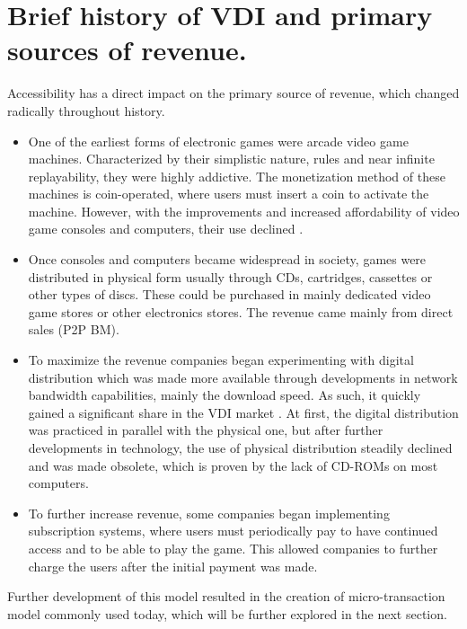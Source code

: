 \documentclass[10pt,british,a4paper,titlepage]{article}
\begin{document}
\section{Brief history of VDI and primary sources of revenue.}

Accessibility has a direct impact on the primary source of revenue, which changed radically throughout history.
 
\begin{itemize}

\item One of the earliest forms of electronic games were arcade video game machines. Characterized by their simplistic nature, rules and near infinite replayability, they were highly addictive\cite{gao2022nature:arcade}. The monetization method of these machines is coin-operated, where users must insert a coin to activate the machine. However, with the improvements and increased affordability of video game consoles and computers, their use declined \cite{osathanunkul2015classification:business}.

\item Once consoles and computers became widespread in society, games were distributed in physical form usually through CDs, cartridges, cassettes or other types of discs. These could be purchased in mainly dedicated video game stores  or other electronics stores. The revenue came mainly from direct sales (P2P BM).

\item To maximize the revenue companies began experimenting with digital distribution which was made more available through developments in network bandwidth capabilities, mainly the download speed. As such, it quickly gained a significant share in the VDI market \cite{osathanunkul2015classification:business}. At first, the digital distribution was practiced in parallel with the physical one, but after further developments in technology, the use of physical distribution steadily declined and was made obsolete, which is proven by the lack of CD-ROMs on most computers.

\item To further increase revenue, some companies began implementing subscription systems, where users must periodically pay to have continued access and to be able to play the game. This allowed companies to further charge the users after the initial payment was made. 

\end{itemize}
Further development of this model resulted in the creation of micro-transaction model commonly used today, which will be further explored in the next section.
\end{document}
